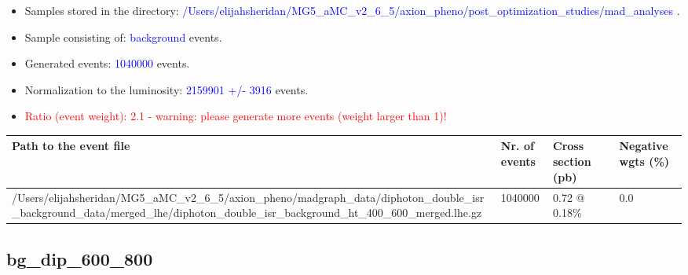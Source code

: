 \documentclass[a4paper, 10pt]{article}
\begin{document}
\begin{itemize}
  \item Samples stored in the directory: \textcolor{blue}{/\-Users/\-elijahsheridan/\-MG5\_aMC\_v2\_6\_5/\-axion\_pheno/\-post\_optimization\_studies/\-mad\_analyses} .
   \item Sample consisting of: \textcolor{blue}{background}  events.
   \item Generated events: \textcolor{blue}{1040000 }  events.
   \item Normalization to the luminosity: \textcolor{blue}{2159901}\textcolor{blue}{ +/\-- }\textcolor{blue}{3916 }  events.
   \item\textcolor{red}{Ratio (event weight): }\textcolor{red}{2.1 }\textcolor{red}{ - warning: please generate more events (weight larger than 1)!}
\textcolor{red}{}
\end{itemize}
\begin{table}[H]
  \begin{center}
    \begin{tabular}{|m{55.0mm}|m{25.0mm}|m{30.0mm}|m{30.0mm}|}
      \hline
      {\cellcolor{yellow}         Path to the event file}& {\cellcolor{yellow}         Nr. of events}& {\cellcolor{yellow}         Cross section (pb)}& {\cellcolor{yellow}         Negative wgts (\%)}\\
      \hline
      {\cellcolor{white}          /\-Users/\-elijahsheridan/\-MG5\_aMC\_v2\_6\_5/\-axion\_pheno/\-madgraph\_data/\-diphoton\_double\_isr\_background\_data/\-merged\_lhe/\-diphoton\_double\_isr\_background\_ht\_400\_600\_merged.lhe.gz}& {\cellcolor{white}          1040000}& {\cellcolor{white}          0.72 @ 0.18\%}& {\cellcolor{white}          0.0}\\
\hline
    \end{tabular}
  \end{center}
\end{table}

\subsection{ bg\_dip\_600\_800}
\end{document}

